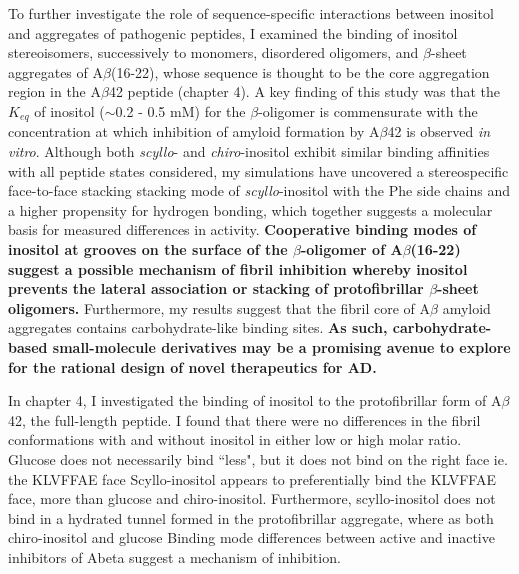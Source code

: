 To further investigate the role of sequence-specific interactions between inositol and aggregates of pathogenic peptides, I examined the binding of  inositol stereoisomers, successively to monomers, disordered oligomers, and $\beta$-sheet aggregates of A$\beta$(16-22), whose sequence is thought to be the core aggregation region in the A$\beta$42 peptide (chapter 4). A key finding of this study was that the $K_{eq}$ of inositol ($\sim$0.2 - 0.5 mM) for the $\beta$-oligomer is commensurate with the concentration at which inhibition of amyloid formation by A$\beta$42 is observed \emph{in vitro}. Although both \emph{scyllo}- and \emph{chiro}-inositol exhibit similar binding affinities with all peptide states considered, my simulations have uncovered a stereospecific face-to-face stacking stacking mode of \emph{scyllo}-inositol with the Phe side chains and a higher propensity for hydrogen bonding, which together suggests a molecular basis for measured differences in activity. \textbf{Cooperative binding modes of inositol at grooves on the surface of the $\beta$-oligomer of A$\beta$(16-22) suggest a possible mechanism of fibril inhibition whereby inositol prevents the lateral association or stacking of protofibrillar $\beta$-sheet oligomers.} Furthermore, my results suggest that the fibril core of A$\beta$ amyloid aggregates contains carbohydrate-like binding sites.  \textbf{As such, carbohydrate-based small-molecule derivatives may be a promising avenue to explore for the rational design of novel therapeutics for AD.}

In chapter 4, I investigated the binding of inositol to the protofibrillar form of A$\beta$42, the full-length peptide. I found that there were no differences in the fibril conformations with and without inositol in either low or high molar ratio.
Glucose does not necessarily bind ``less", but it does not bind on the right face ie. the KLVFFAE face Scyllo-inositol appears to preferentially bind the KLVFFAE face, more than glucose and chiro-inositol.  Furthermore, scyllo-inositol does not bind in a hydrated tunnel formed in the protofibrillar aggregate, where as both chiro-inositol and glucose Binding mode differences between active and inactive inhibitors of Abeta suggest a mechanism of inhibition.

